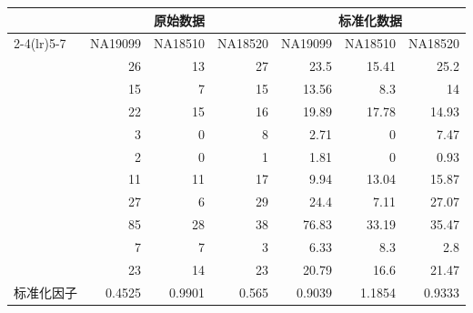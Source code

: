 \begin{table}[htbp]
\centering
{}
\label{tab:ch04a-02}
\small
\setlength{\tabcolsep}{5pt}
\begin{tabular}{lrrrrrr}
\toprule
&\multicolumn{3}{c}{原始数据}&\multicolumn{3}{c}{标准化数据}\\
\cmidrule(lr){2-4}\cmidrule(lr){5-7}
&NA19099&NA18510&NA18520&NA19099&NA18510&NA18520\\
\midrule
 & 26 & 13 & 27 & 23.5 & 15.41 & 25.2\\
 & 15 & 7 & 15 & 13.56 & 8.3 & 14\\
 & 22 & 15 & 16 & 19.89 & 17.78 & 14.93\\
 & 3 & 0 & 8 & 2.71 & 0 & 7.47\\
 & 2 & 0 & 1 & 1.81 & 0 & 0.93\\
 & 11 & 11 & 17 & 9.94 & 13.04 & 15.87\\
 & 27 & 6 & 29 & 24.4 & 7.11 & 27.07\\
 & 85 & 28 & 38 & 76.83 & 33.19 & 35.47\\
 & 7 & 7 & 3 & 6.33 & 8.3 & 2.8\\
 & 23 & 14 & 23 & 20.79 & 16.6 & 21.47\\
标准化因子 & 0.4525 & 0.9901 & 0.565 & 0.9039 & 1.1854 & 0.9333\\
\bottomrule
\end{tabular}
\end{table}
